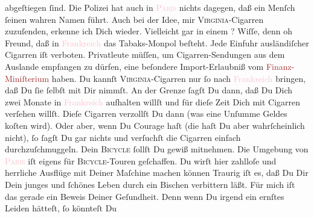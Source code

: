                abgeſtiegen ſind. Die Polizei hat auch in \textsc{\textcolor{pink}{Paris}{}\ledrightnote{\textcolor{pink}{Paris}}} nichts dagegen, daß ein Menſch ſeinen wahren Namen führt.\pend
           \pstart
           Auch bei der Idee, mir \textsc{Virginia}-Cigarren zuzuſenden,
               erkenne ich Dich wieder. Vielleicht gar in einem \label{K_L02806-888v}\label{K_L02806-888h}? Wiſſe, denn
               oh Freund, daß in \textcolor{pink}{Frankreich}{}\ledrightnote{\textcolor{pink}{Frankreich}} das Tabaks-Monpol
               beſteht. Jede Einfuhr  ausländiſcher Cigarren
               iſt verboten. Privatleute müſſen, um Cigarren-Sendungen  aus dem {\pb}Auslande empfangen zu
               dürfen, eine beſondere Import-Erlaubniß vom \textcolor{brown}{Finanz-Miniſterium}{}\ledrightnote{\textcolor{brown}{Französisches Finanzministerium}} haben. Du kannſt \textsc{Virginia}-Cigarren nur ſo nach \textcolor{pink}{Frankreich}{}\ledrightnote{\textcolor{pink}{Frankreich}}
               bringen, daß Du ſie ſelbſt mit Dir nimmſt. An der Grenze ſagſt Du dann, daß Du Dich
               zwei Monate in \textcolor{pink}{Frankreich}{}\ledrightnote{\textcolor{pink}{Frankreich}} aufhalten willſt und
               für dieſe Zeit Dich mit Cigarren verſehen willſt. Dieſe Cigarren verzollſt Du dann
               (was eine Unſumme  Geldes koſten wird). Oder aber,
               wenn Du Courage haſt (die haſt Du aber wahrſcheinlich nicht), {\pb}ſo ſagſt Du gar nichts und verſuchſt die Cigarren
               einfach durchzuſchmuggeln.\pend
           \pstart
           Dein \textsc{Bicycle} ſollſt Du gewiß mitnehmen. Die Umgebung von
                  \textsc{\textcolor{pink}{Paris}{}\ledrightnote{\textcolor{pink}{Paris}}} iſt eigens für \textsc{Bicycle}-Touren geſchaffen. Du wirſt
               hier zahlloſe und herrliche Ausflüge mit Deiner Maſchine machen können{\dotsfive}\pend
           \pstart
           Traurig iſt es, daß Du Dir Dein junges und ſchönes Leben  durch ein Bischen \label{K_L02806-22v}\label{K_L02806-22h} verbittern läßt. Für mich iſt das gerade ein Beweis Deiner {\pb} Geſundheit. Denn wenn Du irgend ein ernſtes Leiden hätteſt, ſo könnteſt Du
